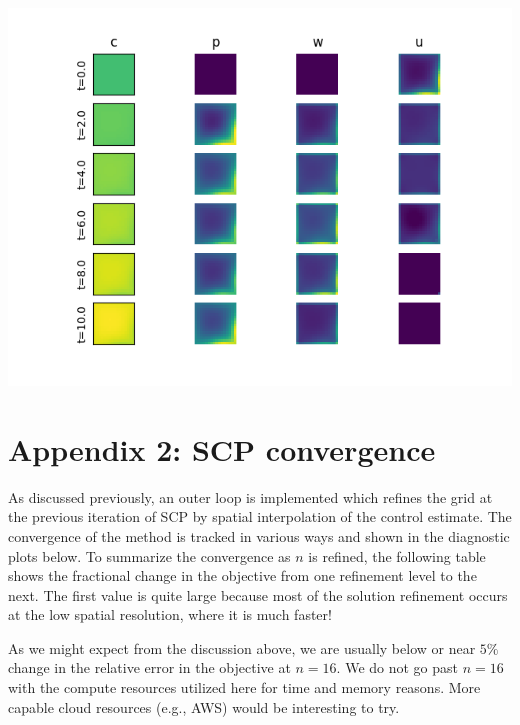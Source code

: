 \documentclass[11pt]{article}
\begin{document}
\begin{minipage}{\textwidth}
	\begin{center}
		\includegraphics[width=0.8\linewidth]{../resim_240718-012904/slices.png}
		\vspace{5pt}
	\end{center}
\end{minipage}

\section{Appendix 2: SCP convergence}

As discussed previously, an outer loop is implemented which refines the grid at the previous iteration of SCP by spatial interpolation of the control estimate. The convergence of the method is tracked in various ways and shown in the diagnostic plots below. To summarize the convergence as $n$ is refined, the following table shows the fractional change in the objective from one refinement level to the next. The first value is quite large because most of the solution refinement occurs at the low spatial resolution, where it is much faster!

As we might expect from the discussion above, we are usually below or near $5\%$ change in the relative error in the objective at $n=16$. We do not go past $n=16$ with the compute resources utilized here for time and memory reasons. More capable cloud resources (e.g., AWS) would be interesting to try.
\end{document}
